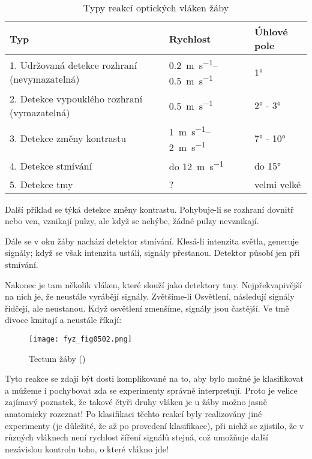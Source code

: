    \begin{table*}[hb!]
      \begin{tabular}{@{}lll@{}}
      \toprule
        \textbf{Typ}                                  & \textbf{Rychlost}            & \textbf{Úhlové pole} \\ \midrule
        1. Udržovaná detekce rozhraní (nevymazatelná) & \SIrange{0.2}{0.5}{\m\per\s} & \ang{1}              \\
        2. Detekce vypouklého rozhraní (vymazatelná)  & \SI{0.5}{\m\per\s}           & \ang{2} - \ang{3}    \\
        3. Detekce změny kontrastu                    & \SIrange{1}{2}{\m\per\s}     & \ang{7} - \ang{10}   \\
        4. Detekce stmívání                           & do \SI{12}{\m\per\s}         & do \ang{15}          \\
        5. Detekce tmy                                & ?                            & velmi velké          \\ \bottomrule
      \end{tabular}
      \caption{Typy reakcí optických vláken žáby}
    \end{table*}

    Další příklad se týká detekce změny kontrastu. Pohybuje-li se rozhraní dovnitř nebo ven,
    vznikají pulzy, ale když se nehýbe, žádné pulzy nevznikají. 
    
    Dále se v oku žáby nachází detektor stmívání. Klesá-li intenzita světla, generuje signály; když
    se však intenzita ustálí, signály přestanou. Detektor působí jen při stmívání.

    Nakonec je tam několik vláken, které slouží jako detektory tmy. Nejpřekvapivější na nich je, že
    neustále vyrábějí signály. Zvětšíme-li Osvětlení, následují signály řidčeji, ale neustanou. Když
    osvětlení zmenšíme, signály jsou častější. Ve tmě divoce kmitají a neustále říkají: 

    \begin{figure}[ht!] %
      \centering
      \texttt{[image: fyz\_fig0502.png]}
      \caption{Tectum žáby (\cite[s.~697]{Feynman01})}
      \label{fyz:fig0502}
    \end{figure}

    Tyto reakce se zdají být dosti komplikované na to, aby bylo možné je klasifikovat a můžeme i
    pochybovat zda se experimenty správně interpretují. Proto je velice zajímavý poznatek, že takové
    čtyři druhy vláken je u žáby možno jasně anatomicky rozeznat! Po klasifikaci těchto reakcí byly
    realizovány jiné experimenty (je důležité, že až po provedení klasifikace), při nichž se
    zjistilo, že v různých vláknech není rychlost šíření signálů stejná, což umožňuje další
    nezávislou kontrolu toho, o které vlákno jde!
    
